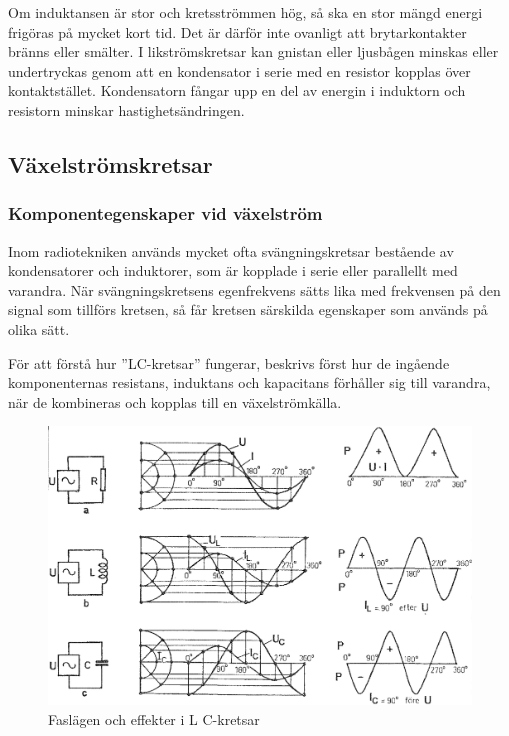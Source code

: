 Om induktansen är stor och kretsströmmen hög, så ska en stor mängd energi
frigöras på mycket kort tid.
Det är därför inte ovanligt att brytarkontakter bränns eller smälter.
I likströmskretsar kan gnistan eller ljusbågen minskas eller undertryckas genom
att en kondensator i serie med en resistor kopplas över kontaktstället.
Kondensatorn fångar upp en del av energin i induktorn och resistorn minskar
hastighetsändringen.

\subsection{Växelströmskretsar}

\subsubsection{Komponentegenskaper vid växelström}

Inom radiotekniken används mycket ofta svängningskretsar bestående av
kondensatorer och induktorer, som är kopplade i serie eller parallellt med
varandra.
När svängningskretsens egenfrekvens sätts lika med frekvensen på den signal som
tillförs kretsen, så får kretsen särskilda egenskaper som används på olika sätt.

För att förstå hur ''LC-kretsar'' fungerar, beskrivs först hur de ingående
komponenternas resistans, induktans och kapacitans förhåller sig till varandra,
när de kombineras och kopplas till en växelströmkälla.

\begin{figure}
\includegraphics[width=\textwidth]{images/cropped_pdfs/bild_2_3-11.pdf}
\caption{Faslägen och effekter i L C-kretsar}
\label{fig:BildII3-11}
\end{figure}

